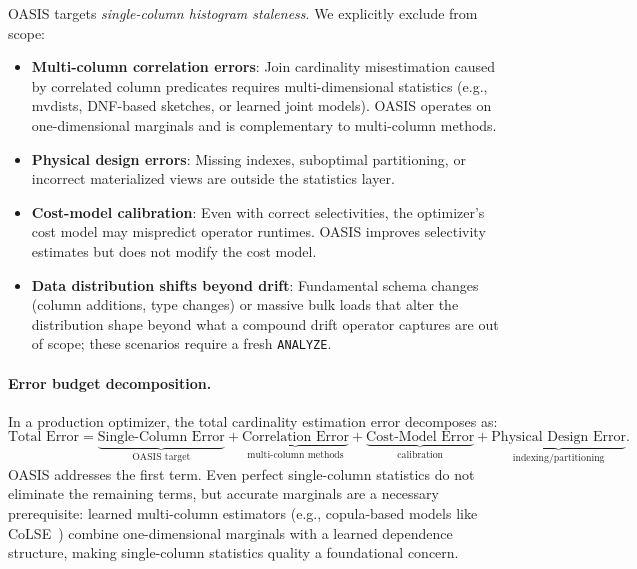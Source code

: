 \documentclass[runningheads]{llncs}
\begin{document}
OASIS targets \emph{single-column histogram staleness}.
We explicitly exclude from scope:
\begin{itemize}
  \item \textbf{Multi-column correlation errors}: Join cardinality misestimation
        caused by correlated column predicates requires multi-dimensional
        statistics (e.g., mvdists, DNF-based sketches, or learned joint models).
        OASIS operates on one-dimensional marginals and is complementary to
        multi-column methods.
  \item \textbf{Physical design errors}: Missing indexes, suboptimal partitioning,
        or incorrect materialized views are outside the statistics layer.
  \item \textbf{Cost-model calibration}: Even with correct selectivities, the
        optimizer's cost model may mispredict operator runtimes.
        OASIS improves selectivity estimates but does not modify the cost model.
  \item \textbf{Data distribution shifts beyond drift}: Fundamental schema changes
        (column additions, type changes) or massive bulk loads that alter the
        distribution shape beyond what a compound drift operator captures are
        out of scope; these scenarios require a fresh \texttt{ANALYZE}.
\end{itemize}

\paragraph{Error budget decomposition.}
In a production optimizer, the total cardinality estimation error decomposes as:
\[
  \text{Total Error} = \underbrace{\text{Single-Column Error}}_{\text{OASIS target}}
  + \underbrace{\text{Correlation Error}}_{\text{multi-column methods}}
  + \underbrace{\text{Cost-Model Error}}_{\text{calibration}}
  + \underbrace{\text{Physical Design Error}}_{\text{indexing/partitioning}}.
\]
OASIS addresses the first term. Even perfect single-column statistics do not
eliminate the remaining terms, but accurate marginals are a necessary
prerequisite: learned multi-column estimators (e.g., copula-based models like
CoLSE~\cite{rathuwadu2025colse}) combine one-dimensional marginals with a
learned dependence structure, making single-column statistics quality a
foundational concern.
\end{document}
